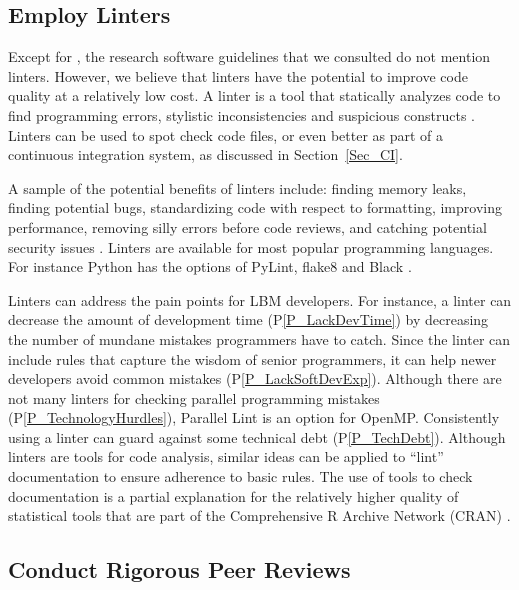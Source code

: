 \documentclass[final, 3p, times, authoryear]{elsarticle}
\newcommand{\ppref}[1]{P\ref{#1}}
\begin{document}
\subsection{Employ Linters} \label{Sec_Linters}

Except for \citet{ThielEtAl2020}, the research software guidelines that we
consulted do not mention linters.  However, we believe that linters have the
potential to improve code quality at a relatively low cost.  A linter is a tool
that statically analyzes code to find programming errors, stylistic
inconsistencies and suspicious constructs \citep{Wikipedia2022_Lint}. Linters
can be used to spot check code files, or even better as part of a continuous
integration system, as discussed in Section~\ref{Sec_CI}.  

A sample of the potential benefits of linters include: finding memory leaks,
finding potential bugs, standardizing code with respect to formatting, improving
performance, removing silly errors before code reviews, and catching potential
security issues \citep{SourceLevel2022_Lint}.  Linters are available for most
popular programming languages.  For instance Python has the options of PyLint,
flake8 and Black \citep{Zadka2018}.

Linters can address the pain points for LBM developers.  For instance, a linter
can decrease the amount of development time (\ppref{P_LackDevTime}) by
decreasing the number of mundane mistakes programmers have to catch.  Since the
linter can include rules that capture the wisdom of senior programmers, it can
help newer developers avoid common mistakes (\ppref{P_LackSoftDevExp}). Although
there are not many linters for checking parallel programming mistakes
(\ppref{P_TechnologyHurdles}), Parallel Lint is an option for OpenMP.
Consistently using a linter can guard against some technical debt
(\ppref{P_TechDebt}). Although linters are tools for code analysis, similar
ideas can be applied to ``lint'' documentation to ensure adherence to basic
rules.  The use of tools to check documentation is a partial explanation for the
relatively higher quality of statistical tools that are part of the
Comprehensive R Archive Network (CRAN) \citep{SmithEtAl2018_StatSoft}.

\subsection{Conduct Rigorous Peer Reviews} \label{Sec_PeerReview}
\end{document}
